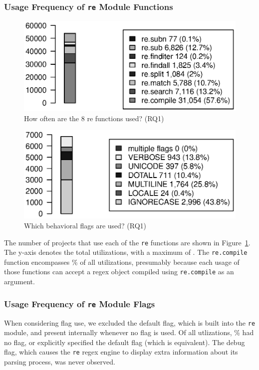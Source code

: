 

\subsubsection{Usage Frequency of {\tt re} Module Functions}

\begin{figure}[tb]
\centering
\includegraphics[width=\columnwidth]{../analysis_output/partFunctions.eps}
\caption{How often are the 8 re functions used? (RQ1)}
\label{fig:partFunctions}
\end{figure}

\begin{figure}[tb]
\centering
\includegraphics[width=\columnwidth]{../analysis_output/partFlags.eps}
\caption{Which behavioral flags are used? (RQ1)}
\label{fig:partFlags}
\end{figure}

The number of projects that use each of the {\tt re} functions are shown in Figure~\ref{fig:partFunctions}.  The y-axis denotes the total utilizations, with a maximum of . The {\tt re.compile} function encompasses \% of all utilizations, presumably because each usage of those functions can accept a regex object compiled using {\tt re.compile} as an argument.

\subsubsection{Usage Frequency of {\tt re} Module Flags}
When considering flag use, we excluded the default flag, which is built into the {\tt re} module, and present internally whenever no flag is used.  Of all utlizations, \% had no flag, or explicitly specified the default flag (which is equivalent).  The debug flag, which causes the {\tt re} regex engine to display extra information about its parsing process, was never observed.

